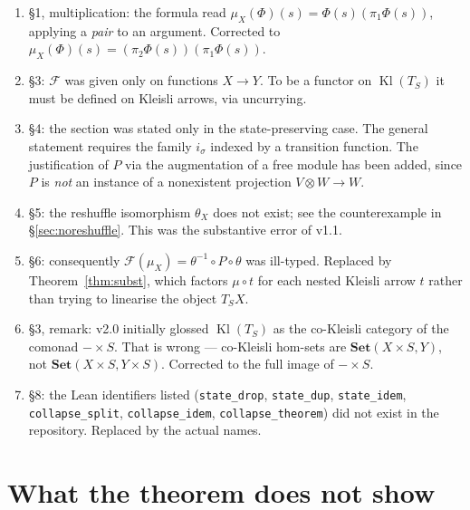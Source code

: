 \documentclass[12pt]{article}
\theoremstyle{plain}
\theoremstyle{remark}
\newcommand{\Set}{\mathbf{Set}}
\newcommand{\Kl}{\operatorname{Kl}}
\begin{document}
\begin{enumerate}
  \item \S1, multiplication: the formula read
        $\mu_X(\Phi)(s)=\Phi(s)(\pi_1\Phi(s))$, applying a \emph{pair} to an
        argument. Corrected to
        $\mu_X(\Phi)(s)=(\pi_2\Phi(s))(\pi_1\Phi(s))$.
  \item \S3: $\mathcal F$ was given only on functions $X\to Y$. To be a functor
        on $\Kl(T_S)$ it must be defined on Kleisli arrows, via uncurrying.
  \item \S4: the section was stated only in the state-preserving case. The
        general statement requires the family $i_\sigma$ indexed by a transition
        function. The justification of $P$ via the augmentation of a free module
        has been added, since $P$ is \emph{not} an instance of a nonexistent
        projection $V\otimes W\to W$.
  \item \S5: the reshuffle isomorphism $\theta_X$ does not exist; see the
        counterexample in \S\ref{sec:noreshuffle}. This was the substantive
        error of v1.1.
  \item \S6: consequently $\mathcal F(\mu_X)=\theta^{-1}\circ P\circ\theta$ was
        ill-typed. Replaced by Theorem~\ref{thm:subst}, which factors
        $\mu\circ t$ for each nested Kleisli arrow $t$ rather than trying to
        linearise the object $T_SX$.
  \item \S3, remark: v2.0 initially glossed $\Kl(T_S)$ as the co-Kleisli category
        of the comonad $-\times S$. That is wrong --- co-Kleisli hom-sets are
        $\Set(X\times S,Y)$, not $\Set(X\times S,Y\times S)$. Corrected to the full
        image of $-\times S$.
  \item \S8: the Lean identifiers listed
        (\verb|state_drop|, \verb|state_dup|, \verb|state_idem|,
        \verb|collapse_split|, \verb|collapse_idem|, \verb|collapse_theorem|)
        did not exist in the repository. Replaced by the actual names.
\end{enumerate}

\bigskip
\section{What the theorem does not show}
\end{document}

